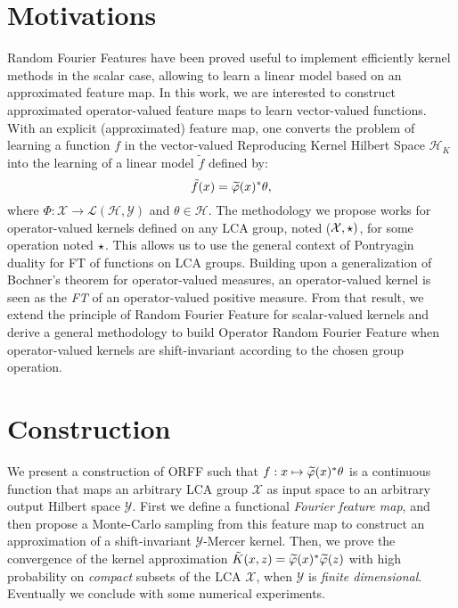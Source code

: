 \section{Motivations}
\label{sec:motivations}
Random Fourier Features have been proved useful to implement efficiently kernel methods in the scalar case, allowing to learn a linear model based on an approximated feature map. In this work, we are interested to construct approximated operator-valued feature maps to learn vector-valued functions. With an explicit (approximated) feature map, one converts the problem of learning a function $f$ in the vector-valued Reproducing Kernel Hilbert Space $\mathcal{H}_K$ into the learning of a linear model $\tilde{f}$ defined by:
 \begin{dmath*}
 \tilde{f}(x) = \tildePhi{1:D}(x)^\adjoint  \theta,
 \end{dmath*}
 where $\Phi: \mathcal{X} \to \mathcal{L}(\mathcal{H},\mathcal{Y})$ and $\theta \in \mathcal{H}$. The methodology we propose works for operator-valued kernels defined on any \acf{LCA} group, noted ($\mathcal{X}, \star)$, for some operation noted $\star$. This allows us to use the general context of Pontryagin duality for \acl{FT} of functions on \acs{LCA} groups. Building upon a generalization of Bochner's theorem for operator-valued measures, an operator-valued kernel is seen as the \emph{\acl{FT}} of an operator-valued positive measure. From that result, we extend the principle of Random Fourier Feature for scalar-valued kernels and derive a general methodology to build Operator Random Fourier Feature when operator-valued kernels are shift-invariant according to the chosen group operation.

\clearpage
\section{Construction}
\label{sec:construction}
We present a construction of \acf{ORFF} such that $f: x\mapsto \tildePhi{1:D}(x)^\adjoint \theta$ is a continuous function that maps an arbitrary \acs{LCA} group $\mathcal{X}$ as input space to an arbitrary output Hilbert space $\mathcal{Y}$. First we define a functional \emph{Fourier feature map}, and then propose a Monte-Carlo sampling from this feature map to construct an approximation of a shift-invariant $\mathcal{Y}$-Mercer kernel.
Then, we prove the convergence of the kernel approximation $\tilde{K}(x,z)=\tildePhi{1:D}(x)^\adjoint \tildePhi{1:D}(z)$ with high probability on \emph{compact} subsets of the \acs{LCA} $\mathcal{X}$, when $\mathcal{Y}$ is \emph{finite dimensional}. Eventually we conclude with some numerical experiments.
